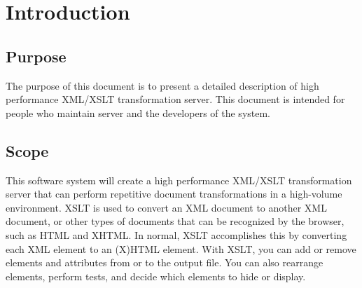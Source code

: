 \section{Introduction}

\subsection{Purpose}
The purpose of this document is to present a detailed description of high performance XML/XSLT transformation server.
This document is intended for people who maintain server and the developers of the system. 

\subsection{Scope}
This software system will create a high performance XML/XSLT transformation server that can perform repetitive document transformations in a high-volume environment. 
XSLT is used to convert an XML document to another XML document, or other types of documents that can be recognized by the browser, such as HTML and XHTML. 
In normal, XSLT accomplishes this by converting each XML element to an (X)HTML element. With XSLT, you can add or remove elements and attributes from or to the output file. 
You can also rearrange elements, perform tests, and decide which elements to hide or display. 

